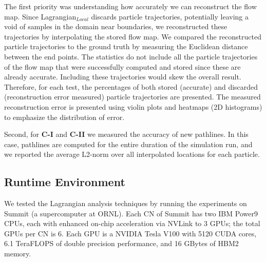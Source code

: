 The first priority was understanding how accurately we can reconstruct the flow map. 
%
Since Lagrangian$_{Local}$ discards particle trajectories, potentially leaving a void of samples in the domain near boundaries, we reconstructed these trajectories by interpolating the stored flow map.
%
We compared the reconstructed particle trajectories to the ground truth by measuring the Euclidean distance between the end points.
%
The statistics do not include all the particle trajectories of the flow map that were successfully computed and stored since these are already accurate.
%
Including these trajectories would skew the overall result.
%
Therefore, for each test, the percentages of both stored (accurate) and discarded (reconstruction error measured) particle trajectories are presented.
%
The measured reconstruction error is presented using violin plots and heatmaps (2D histograms) to emphasize the distribution of error. 

Second, for \textbf{C-I} and \textbf{C-II} we measured the accuracy of new pathlines.
%
In this case, pathlines are computed for the entire duration of the simulation run, and we reported the average L2-norm over all interpolated locations for each particle.
%

%
\subsection{Runtime Environment}
\label{sec:runtime}
We tested the Lagrangian analysis techniques by running the experiments on Summit (a supercomputer at ORNL).
%
Each CN of Summit has two IBM Power9 CPUs,
%
each with enhanced on-chip acceleration via NVLink to 3 GPUs; the total GPUs per CN is 6.
%
Each GPU is a NVIDIA Tesla V100 with 5120 CUDA cores, 6.1 TeraFLOPS of double precision performance, and 16 GBytes of HBM2 memory.
